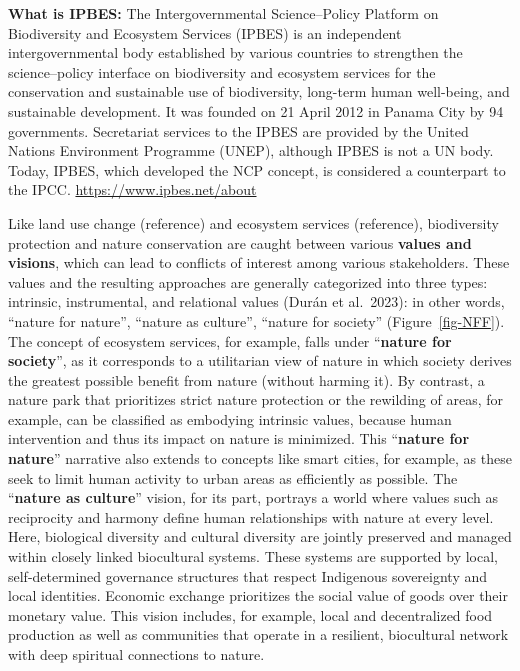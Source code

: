 \documentclass[
  a4paper,
  openany]{book}
\begin{document}
\begin{tcolorbox}[enhanced jigsaw, left=2mm, arc=.35mm, titlerule=0mm, opacityback=0, leftrule=.75mm, title={Note}, breakable, bottomtitle=1mm, rightrule=.15mm, coltitle=black, toptitle=1mm, bottomrule=.15mm, colback=white, opacitybacktitle=0.6, colbacktitle=quarto-callout-note-color!10!white, toprule=.15mm, colframe=quarto-callout-note-color-frame]

\textbf{What is IPBES:} The Intergovernmental Science--Policy Platform
on Biodiversity and Ecosystem Services (IPBES) is an independent
intergovernmental body established by various countries to strengthen
the science--policy interface on biodiversity and ecosystem services for
the conservation and sustainable use of biodiversity, long-term human
well-being, and sustainable development. It was founded on 21 April 2012
in Panama City by 94 governments. Secretariat services to the IPBES are
provided by the United Nations Environment Programme (UNEP), although
IPBES is not a UN body. Today, IPBES, which developed the NCP concept,
is considered a counterpart to the IPCC.
\url{https://www.ipbes.net/about}

\end{tcolorbox}

Like land use change (reference) and ecosystem services (reference),
biodiversity protection and nature conservation are caught between
various \textbf{values and visions}, which can lead to conflicts of
interest among various stakeholders. These values and the resulting
approaches are generally categorized into three types: intrinsic,
instrumental, and relational values (Durán et al.~2023): in other words,
``nature for nature'', ``nature as culture'', ``nature for society''
(Figure~\ref{fig-NFF}). The concept of ecosystem services, for example,
falls under ``\textbf{nature for society}'', as it corresponds to a
utilitarian view of nature in which society derives the greatest
possible benefit from nature (without harming it). By contrast, a nature
park that prioritizes strict nature protection or the rewilding of
areas, for example, can be classified as embodying intrinsic values,
because human intervention and thus its impact on nature is minimized.
This ``\textbf{nature for nature}'' narrative also extends to concepts
like smart cities, for example, as these seek to limit human activity to
urban areas as efficiently as possible. The ``\textbf{nature as
culture}'' vision, for its part, portrays a world where values such as
reciprocity and harmony define human relationships with nature at every
level. Here, biological diversity and cultural diversity are jointly
preserved and managed within closely linked biocultural systems. These
systems are supported by local, self-determined governance structures
that respect Indigenous sovereignty and local identities. Economic
exchange prioritizes the social value of goods over their monetary
value. This vision includes, for example, local and decentralized food
production as well as communities that operate in a resilient,
biocultural network with deep spiritual connections to nature.
\end{document}
